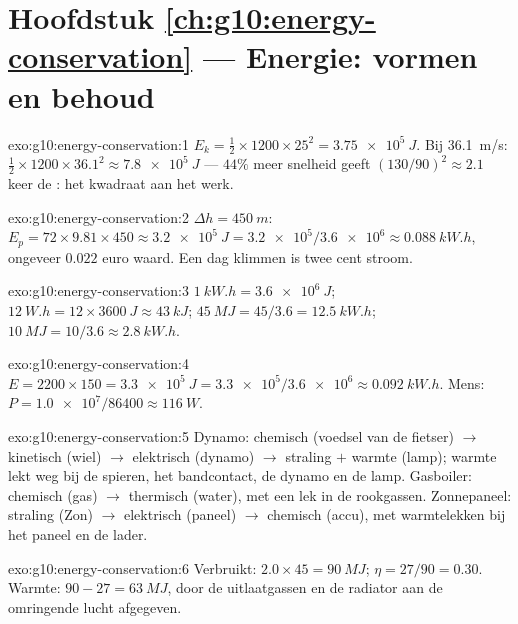 \section*{Hoofdstuk \ref{ch:g10:energy-conservation} --- Energie: vormen en behoud}

\begin{solution}{exo:g10:energy-conservation:1}
$E_k = \tfrac12 \times 1200 \times 25^2 = \qty{3.75e5}{J}$. Bij
\qty{36.1}{m/s}: $\tfrac12 \times 1200 \times 36.1^2 \approx
\qty{7.8e5}{J}$ --- $44\%$ meer snelheid geeft $(130/90)^2 \approx 2.1$
keer de : het kwadraat aan het werk.
\end{solution}

\begin{solution}{exo:g10:energy-conservation:2}
$\Delta h = \qty{450}{m}$:
$E_p = 72 \times 9.81 \times 450 \approx \qty{3.2e5}{J}
= \num{3.2e5}/\num{3.6e6} \approx \qty{0.088}{kW.h}$, ongeveer $0.022$
euro waard. Een dag klimmen is twee cent stroom.
\end{solution}

\begin{solution}{exo:g10:energy-conservation:3}
$\qty{1}{kW.h} = \qty{3.6e6}{J}$;
$\qty{12}{W.h} = 12 \times \qty{3600}{J} \approx \qty{43}{kJ}$;
$\qty{45}{MJ} = 45/3.6 = \qty{12.5}{kW.h}$;
$\qty{10}{MJ} = 10/3.6 \approx \qty{2.8}{kW.h}$.
\end{solution}

\begin{solution}{exo:g10:energy-conservation:4}
$E = 2200 \times 150 = \qty{3.3e5}{J}
= \num{3.3e5}/\num{3.6e6} \approx \qty{0.092}{kW.h}$. Mens:
$P = \num{1.0e7}/\num{86400} \approx \qty{116}{W}$.
\end{solution}

\begin{solution}{exo:g10:energy-conservation:5}
Dynamo: chemisch (voedsel van de fietser) $\to$ kinetisch (wiel) $\to$
elektrisch (dynamo) $\to$ straling $+$ warmte (lamp); warmte lekt weg bij
de spieren, het bandcontact, de dynamo en de lamp. Gasboiler: chemisch
(gas) $\to$ thermisch (water), met een lek in de rookgassen. Zonnepaneel:
straling (Zon) $\to$ elektrisch (paneel) $\to$ chemisch (accu), met
warmtelekken bij het paneel en de lader.
\end{solution}

\begin{solution}{exo:g10:energy-conservation:6}
Verbruikt: $2.0 \times 45 = \qty{90}{MJ}$; $\eta = 27/90 = 0.30$.
Warmte: $90 - 27 = \qty{63}{MJ}$, door de uitlaatgassen en de radiator
aan de omringende lucht afgegeven.
\end{solution}

